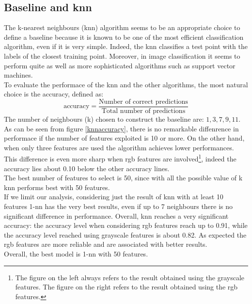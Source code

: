 \documentclass{article}
\begin{document}
\subsection{Baseline and knn}
The k-nearest neighbours (knn) algorithm seems to be an appropriate choice to define a baseline because it is known to be one of the most efficient classification algorithm, even if it is very simple. Indeed, the knn classifies a test point with the labels of the closest training point. Moreover, in image classification it seems to perform quite as well as more sophisticated algorithms such as support vector machines. \cite{knnresults} \\
To evaluate the performace of the knn and the other algorithms, the most natural choice is the accuracy, defined as:
\begin{equation}
\text{accuracy}  = \frac{\text{Number of correct predictions}}{ \text{Total number of predictions}}
\end{equation}
\noindent The number of neighbours (k) chosen to construct the baseline are: $1,3,7,9,11$.
As can be seen from figure \ref{knnaccuracy}, there is no remarkable diffenrence in performace if the number of features exploited is 10 or more. On the other hand, when only three features are used the algorithm achieves lower performances. This difference is even more sharp when rgb features are involved\footnote{The figure on the left always refers to the result obtained using the grayscale features. The figure on the right refers to the result obtained using the rgb features.}, indeed the accuracy lies about 0.10 below the other accuracy lines.\\
The best number of features to select is 50, since with all the possible value of k knn performs best with 50 features.\\
If we limit our analysis, considering just the result of knn with at least 10 features 1-nn has the very best results, even if up to 7 neighbours there is no significant difference in performance.
Overall, knn reaches a very significant accuracy: the accuracy level  when considering rgb features reach up to 0.91, while the accuracy level reached using grayscale features is about 0.82. As expected the rgb features are more reliable and are associated with better results.\\
Overall, the best model is 1-nn with 50 features.
\end{document}
